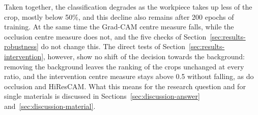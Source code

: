 \bigskip
\noindent
Taken together, the classification degrades as the workpiece takes up less of the crop,
mostly below 50\%, and this decline also remains after 200 epochs of training. At the
same time the Grad-CAM centre measure falls, while the occlusion centre measure does not,
and the five checks of Section~\ref{sec:results-robustness} do not change this. The
direct tests of Section~\ref{sec:results-intervention}, however, show no shift of the
decision towards the background: removing the background leaves the ranking of the
crops unchanged at every ratio, and the intervention centre measure stays above 0.5
without falling, as do occlusion and HiResCAM. What this means for the research question
and for single materials is discussed in Sections~\ref{sec:discussion-answer}
and~\ref{sec:discussion-material}.
